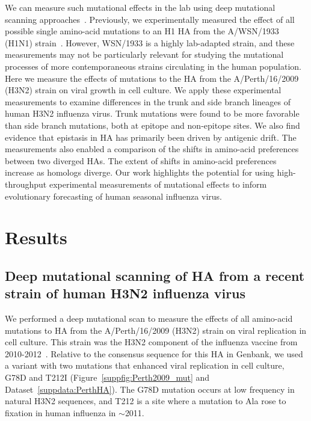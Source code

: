 \documentclass[9pt,twocolumn,twoside]{pnas-new}
\begin{document}
We can measure such mutational effects in the lab using deep mutational scanning approaches~\cite{fowler2010high}.
Previously, we experimentally measured the effect of all possible single amino-acid mutations to an H1 HA from the A/WSN/1933 (H1N1) strain~\cite{thyagarajan2014inherent,doud2016accurate}.
However, WSN/1933 is a highly lab-adapted strain, and these measurements may not be particularly relevant for studying the mutational processes of more contemporaneous strains circulating in the human population.
Here we measure the effects of mutations to the HA from the A/Perth/16/2009 (H3N2) strain on viral growth in cell culture.
We apply these experimental measurements to examine differences in the trunk and side branch lineages of human H3N2 influenza virus.
Trunk mutations were found to be more favorable than side branch mutations, both at epitope and non-epitope sites.
We also find evidence that epistasis in HA has primarily been driven by antigenic drift.
The measurements also enabled a comparison of the shifts in amino-acid preferences between two diverged HAs.
The extent of shifts in amino-acid preferences increase as homologs diverge.
Our work highlights the potential for using high-throughput experimental measurements of mutational effects to inform evolutionary forecasting of human seasonal influenza virus.

\section*{Results}
\label{sec:results}

\subsection*{Deep mutational scanning of HA from a recent strain of human H3N2 influenza virus}
We performed a deep mutational scan to measure the effects of all amino-acid mutations to HA from the A/Perth/16/2009 (H3N2) strain on viral replication in cell culture. 
This strain was the H3N2 component of the influenza vaccine from 2010-2012~\cite{who2010d,who2011}.
Relative to the consensus sequence for this HA in Genbank, we used a variant with two mutations that enhanced viral replication in cell culture, G78D and T212I (Figure~\ref{suppfig:Perth2009_mut} and Dataset~\ref{suppdata:PerthHA}).
The G78D mutation occurs at low frequency in natural H3N2 sequences, and T212 is a site where a mutation to Ala rose to fixation in human influenza in $\sim$2011.
\end{document}
